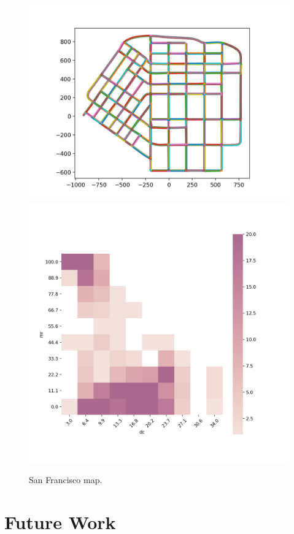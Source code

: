 \documentclass[conference]{IEEEtran}
\begin{document}
\begin{figure}[p]
  \includegraphics[width=\linewidth]{images/map_sanfrancisco.png}
  \includegraphics[width=\linewidth]{images/feature_sanfrancisco.png}
  \caption{San Francisco map.}
    \label{fig:feature-maps-sanfrancisco}
\endminipage
\hfill
\end{figure}

\section{Future Work}
\end{document}
